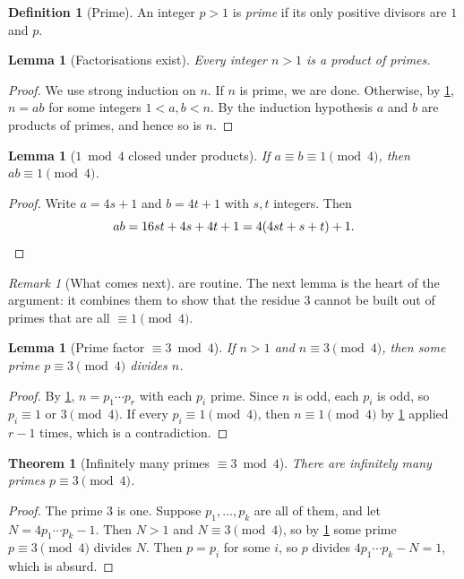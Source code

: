 \documentclass[11pt]{article}
\theoremstyle{plain}
\theoremstyle{definition}
\theoremstyle{remark}
\newcounter{hffc}
\theoremstyle{definition}
\newtheorem{hffdef}[hffc]{Definition}
\theoremstyle{plain}
\newtheorem{hfflem}[hffc]{Lemma}
\newtheorem{hffthm}[hffc]{Theorem}
\theoremstyle{remark}
\newtheorem{hffrem}[hffc]{Remark}
\newcommand{\hffcost}{}
\newcommand{\setcost}[1]{\renewcommand{\hffcost}{#1}}
\begin{document}
\begin{tcolorbox}
\begin{hffdef}[Prime]\label{ex:D1}
An integer $p > 1$ is \emph{prime} if its only positive divisors are $1$ and $p$.
\end{hffdef}

\begin{hfflem}[Factorisations exist]\label{ex:L2}
Every integer $n > 1$ is a product of primes.
\end{hfflem}
\begin{proof}\setcost{length 159/300}
We use strong induction on $n$. If $n$ is prime, we are done. Otherwise, by \cref{ex:D1}, $n = ab$ for some integers $1 < a, b < n$. By the induction hypothesis $a$ and $b$ are products of primes, and hence so is $n$.
\end{proof}

\begin{hfflem}[$1 \bmod 4$ closed under products]\label{ex:L3}
If $a \equiv b \equiv 1 \pmod 4$, then $ab \equiv 1 \pmod 4$.
\end{hfflem}
\begin{proof}\setcost{length 69/300}
Write $a = 4s + 1$ and $b = 4t + 1$ with $s, t$ integers. Then
\[
  ab = 16st + 4s + 4t + 1 = 4(4st + s + t) + 1. \qedhere
\]
\end{proof}

\begin{hffrem}[What comes next]\label{ex:R4}
 are routine. The next lemma is the heart of the argument: it combines them to show that the residue $3$ cannot be built out of primes that are all $\equiv 1 \pmod 4$.
\end{hffrem}

\begin{hfflem}[Prime factor $\equiv 3 \bmod 4$]\label{ex:L5}
If $n > 1$ and $n \equiv 3 \pmod 4$, then some prime $p \equiv 3 \pmod 4$ divides $n$.
\end{hfflem}
\begin{proof}\setcost{length 151/300}
By \cref{ex:L2}, $n = p_1 \cdots p_r$ with each $p_i$ prime. Since $n$ is odd, each $p_i$ is odd, so $p_i \equiv 1$ or $3 \pmod 4$. If every $p_i \equiv 1 \pmod 4$, then $n \equiv 1 \pmod 4$ by \cref{ex:L3} applied $r - 1$ times, which is a contradiction.
\end{proof}

\begin{hffthm}[Infinitely many primes $\equiv 3 \bmod 4$]\label{ex:T6}
There are infinitely many primes $p \equiv 3 \pmod 4$.
\end{hffthm}
\begin{proof}\setcost{length 174/300}
The prime $3$ is one. Suppose $p_1, \dots, p_k$ are all of them, and let $N = 4p_1 \cdots p_k - 1$. Then $N > 1$ and $N \equiv 3 \pmod 4$, so by \cref{ex:L5} some prime $p \equiv 3 \pmod 4$ divides $N$. Then $p = p_i$ for some $i$, so $p$ divides $4p_1 \cdots p_k - N = 1$, which is absurd.
\end{proof}


\end{tcolorbox}
\end{document}
